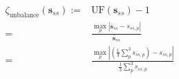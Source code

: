 \begin{equation}
	\begin{split}
		\zeta_\text{unbalance}(\textbf{s}_{ss}):=&\text{UF}(\textbf{s}_{ss}) - 1\\
		=&\frac{\max_p\left|\bar{\textbf{s}}_{ss} - s_{ss,p}\right|}{\bar{\textbf{s}}_{ss}}\\
		=&\frac{\max_p\left|\left(\frac{1}{3}\sum_p^3{s_{ss,p}}\right) - s_{ss,p}\right|}{\frac{1}{3}\sum_p^3{s_{ss,p}}}
	\end{split}
	\label{ch1:equ:unbalance-cost}
\end{equation}